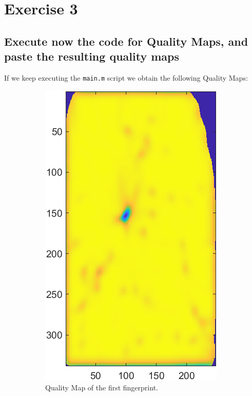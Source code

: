 \documentclass[a4paper]{article}
\def\inline{\lstinline[basicstyle=\ttfamily,keywordstyle={}]}
\begin{document}
\section{Exercise 3}
\subsection{ Execute now the code for Quality Maps, and paste the resulting quality maps}

If we keep executing the \inline{main.m} script we obtain the following Quality Maps:



\begin{figure}[H]
  \centering
       \begin{subfigure}[t]{0.45\textwidth}
         \centering
         \includegraphics[scale=0.8]{Figures/QMap1}
         \caption{Quality Map of the first fingerprint.}
     \end{subfigure}%
     \quad
     \begin{subfigure}[t]{0.45\textwidth}
         \centering

\end{subfigure}
\end{figure}
\end{document}
